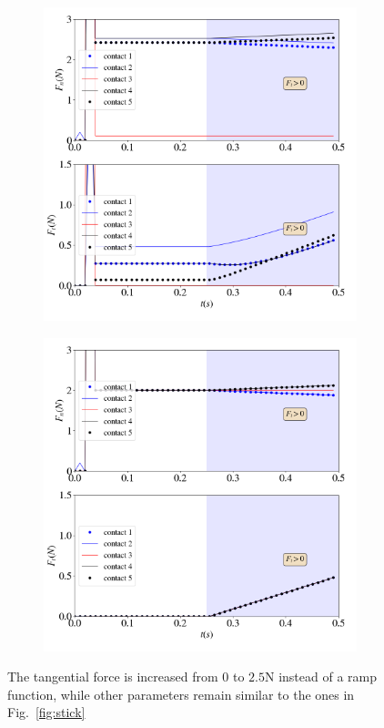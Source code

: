 \begin{itemize}
\begin{figure}[H]
\begin{subfigure}{0.48\columnwidth}
			\includegraphics[width=1.\textwidth]{images/CD/stick_T.png}
		\end{subfigure}	
		\begin{subfigure}{0.48\columnwidth}	
			\centering
			\includegraphics[width=1.\textwidth]{images/CD/stick_T_reg.png}
		\end{subfigure}	
		\caption{The tangential force is increased from 0 to $2.5$\si{N} instead of a ramp function, while other parameters remain similar to the ones in Fig.~\ref{fig:stick}}\label{fig:stick_T}
	\end{figure}
	

\end{itemize}
